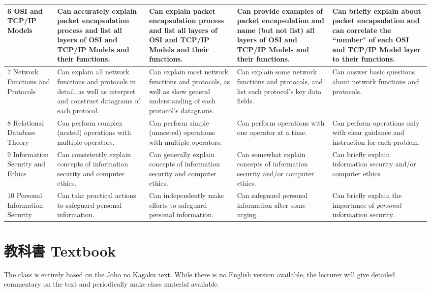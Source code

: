 \documentclass{article}
\begin{document}
\begin{landscape}
\begin{longtable}{|p{3.0cm}|p{4cm}|p{4cm}|p{4cm}|p{4cm}|}
\\
\hline
6 OSI and TCP/IP Models &
  Can accurately explain packet encapsulation process and list all layers of OSI and TCP/IP Models and their functions. &
  Can explain packet encapsulation process and list all layers of OSI and TCP/IP Models and their functions. &
  Can provide examples of packet encapsulation and name (but not list) all layers of OSI and TCP/IP Models and their functions. &
  Can briefly explain about packet encapsulation and can correlate the ``number" of each OSI and TCP/IP Model layer to their functions.
\\
\hline
7 Network Functions and Protocols &
  Can explain all network functions and protocols in detail, as well as interpret and construct datagrams of each protocol. &
  Can explain most network functions and protocols, as well as show general understanding of each protocol's datagrams. &
  Can explain some network functions and protocols, and list each protocol's key data fields. &
  Can answer basic questions about network functions and protocols.
\\
\hline
8 Relational Database Theory &
  Can perform complex (nested) operations with multiple operators. &
  Can perform simple (unnested) operations with multiple operators. &
  Can perform operations with one operator at a time. &
  Can perform operations only with clear guidance and instruction for each problem.
\\
\hline
9 Information Security and Ethics &
  Can consistently explain concepts of information security and computer ethics. &
  Can generally explain concepts of information security and computer ethics. &
  Can somewhat explain concepts of information security and/or computer ethics. &
  Can briefly explain information security and/or computer ethics.
\\
\hline
10 Personal Information Security &
  Can take practical actions to safeguard personal information. &
  Can independently make efforts to safeguard personal information. &
  Can safeguard personal information after some urging. &
  Can briefly explain the importance of \textit{personal} information security.
\\
\hline

\end{longtable}

\end{landscape}

\section{教科書 Textbook}
The class is entirely based on the J\={o}h\={o} no Kagaku text. While there is no English version available, the lecturer will give detailed commentary on the text and periodically make class material available.
\end{document}
